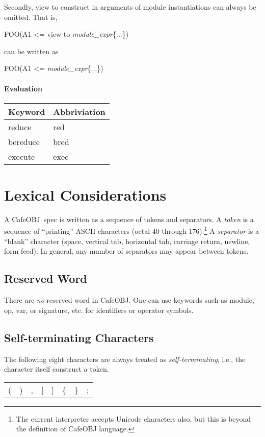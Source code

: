 \documentclass[a4paper]{article}
\def\cafeobj{\textsf{CafeOBJ}}
\def\sym#1{\textsf{#1}\null}
\def\nonterm#1{\textit{#1}\null}
\begin{document}
Secondly, \sym{view to} construct in arguments of module
instantiations can always be omitted. That is,
\begin{example}
  FOO(A1 <= \sym{view to} \nonterm{module\_expr}\{...\})
\end{example}
can be written as
\begin{example}
  FOO(A1 <= \nonterm{module\_expr}\{...\})
\end{example}

\paragraph{Evaluation}
\begin{center}
\begin{tabular}{ll}\hline
Keyword & Abbriviation \\\hline
\sym{reduce} & \sym{red} \\
\sym{bereduce} & \sym{bred} \\
\sym{execute} & \sym{exec} \\\hline
\end{tabular}
\end{center}

\section{Lexical Considerations}
\label{sec:lex}
A \cafeobj\ spec is written as a sequence of tokens and separators.
A \textit{token} is a sequence of ``printing'' ASCII characters (octal
40 through 176).\footnote{The current interpreter accepts Unicode characters also, but this is beyond the definition of
  CafeOBJ language.}
A \textit{separator} is a ``blank'' character (space, vertical
tab, horizontal tab, carriage return, newline, form feed).
In general, any mumber of separators may appear between tokens. 

\subsection{Reserved Word}
\label{sec:keywords}
There are \textit{no\/} reserved word in \cafeobj.
One can use keywords such as \sym{module}, \sym{op}, \sym{var},
or \sym{signature}, etc. for identifiers or operator symbols.

\subsection{Self-terminating Characters}
\label{sec:selfterminating}
The following eight characters are always treated as \textit{self-terminating},
i.e., the character itself construct a token.
\begin{center}
\begin{tabular}{llllllll}
  \sym{(} & \sym{)} & \sym{,} & \sym{[} & \sym{]}
  & \sym{\{} & \sym{\}} & \sym{;}
\end{tabular}
\end{center}
\end{document}
